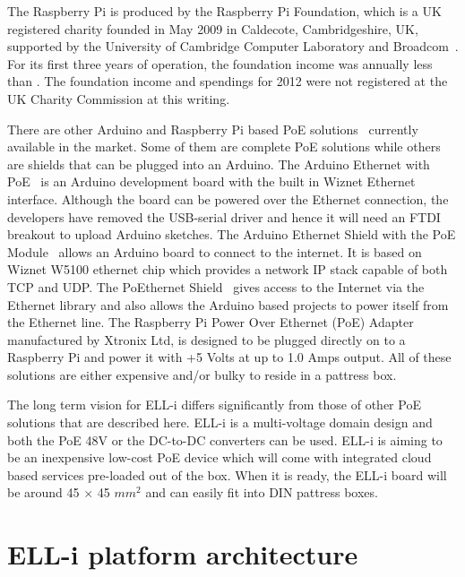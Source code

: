 \documentclass[final]{siamltex}
\begin{document}
The Raspberry Pi is produced by the Raspberry Pi Foundation, which is
a UK registered charity founded in May 2009 in Caldecote,
Cambridgeshire, UK, supported by the University of Cambridge Computer
Laboratory and Broadcom~\cite{RaspiFoundationWikipedia}.  For its
first three years of operation, the foundation income was annually
less than .  The foundation income and spendings for 2012
were not registered at the UK Charity Commission at this writing.

There are other Arduino and Raspberry Pi based PoE
solutions~\cite{ArduinoEthernetPOE} \cite{ArduinoEthernetShieldPOE}
\cite{POEthernetShield} \cite{etherduino} \cite{xtronix} currently available in
the market. Some of them are complete PoE solutions while others are shields
that can be plugged into an Arduino. The Arduino Ethernet with
PoE~\cite{ArduinoEthernetPOE} is an Arduino development board with the built in
Wiznet Ethernet interface. Although the board can be powered over the Ethernet
connection, the developers have removed the USB-serial driver and hence it will
need an FTDI breakout to upload Arduino sketches. The Arduino Ethernet Shield
with the PoE Module~\cite{ArduinoEthernetShieldPOE} allows an Arduino board to
connect to the internet. It is based on Wiznet W5100 ethernet chip which
provides a network IP stack capable of both TCP and UDP. The PoEthernet
Shield~\cite{POEthernetShield} gives access to the Internet via the Ethernet
library and also allows the Arduino based projects to power itself from the
Ethernet line. The Raspberry Pi Power Over Ethernet (PoE) Adapter~\cite{xtronix}
manufactured by Xtronix Ltd, is designed to be plugged directly on to a
Raspberry Pi and power it with +5 Volts at up to 1.0 Amps output. All of these
solutions are either expensive and/or bulky to reside in a pattress box.

The long term vision for ELL-i differs significantly from those of other PoE
solutions that are described here. ELL-i is a multi-voltage domain design and
both the PoE 48V or the DC-to-DC converters can be used. ELL-i is aiming to be
an inexpensive low-cost PoE device which will come with integrated cloud based
services pre-loaded out of the box. When it is ready, the ELL-i board will be
around 45 $\times$ 45 $mm^2$ and can easily fit into DIN pattress boxes. 



\section{ELL-i platform architecture}
\label{sec:architecture}
\end{document}
